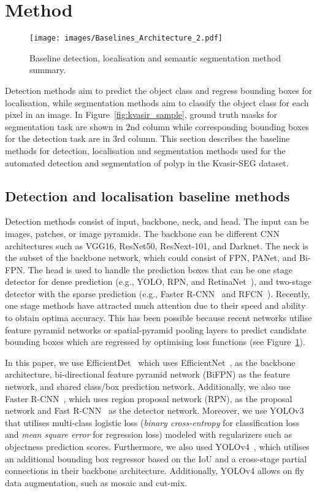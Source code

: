 \documentclass[journal]{IEEEtran}
\begin{document}
\section{Method}

\label{method}
\begin{figure}
    \centering
    \texttt{[image: images/Baselines\_Architecture\_2.pdf]}
    \caption{Baseline detection, localisation and semantic segmentation method summary.}
    \label{fig:baseline}
\end{figure}

Detection methods aim to predict the object class and regress bounding boxes for localisation, while segmentation methods aim to classify the object class for each pixel in an image. In Figure~\ref{fig:kvasir_sample}, ground truth masks for segmentation task are shown in 2nd column while corresponding bounding boxes for the detection task are in 3rd column.  This section describes the baseline methods for detection, localisation and segmentation methods used for the automated detection and segmentation of polyp in the Kvasir-SEG dataset.

\subsection{Detection and localisation baseline methods}
Detection methods consist of input, backbone, neck, and head. The input can be images, patches, or image pyramids. The backbone can be different \ac{CNN} architectures such as VGG16, ResNet50, ResNext-101, and Darknet. The neck is the subset of the backbone network, which could consist of FPN, PANet, and Bi-FPN. The head is used to handle the prediction boxes that can be one stage detector for dense prediction (e.g., YOLO, RPN, and RetinaNet~\cite{lin2017focal}), and two-stage detector with the sparse prediction (e.g., Faster R-CNN~\cite{ren2015faster}  and RFCN~\cite{dai2016r}).
Recently, one stage methods have attracted much attention due to their speed and ability to obtain optima accuracy. This has been possible because recent networks utilise feature pyramid networks or spatial-pyramid pooling layers to predict candidate bounding boxes which are regressed by optimising loss functions (see Figure~\ref{fig:baseline}).

In this paper, we use EfficientDet~\cite{tan2020efficientdet} which uses EfficientNet~\cite{tan2019efficientnet}, as the backbone architecture, bi-directional feature  pyramid network (BiFPN) as the feature network, and shared class/box prediction network. Additionally, we also use Faster R-CNN~\cite{ren2015faster}, which uses region proposal network (RPN), as the proposal network and Fast R-CNN~\cite{girshick2015fast} as the detector network.  
Moreover, we use YOLOv3~\cite{redmon2018yolov3} that utilises multi-class logistic loss (\textit{binary cross-entropy} for classification loss and \textit{mean square error} for regression loss) modeled with regularizers such as objectness prediction scores. 
Furthermore, we also used YOLOv4~\cite{bochkovskiy2020yolov4}, which  utilises an additional bounding box regressor based on the \ac{IoU} and a cross-stage partial connections in their backbone architecture. Additionally, YOLOv4 allows on fly data augmentation, such as mosaic and cut-mix.
\end{document}
